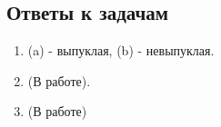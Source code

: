\documentclass{article}
\begin{document}
 \subsection*{Ответы к задачам}
 \begin{enumerate}
    \item (a) - выпуклая, (b) - невыпуклая.
    \item (В работе).
    \item (В работе)
 \end{enumerate}


\end{document}
